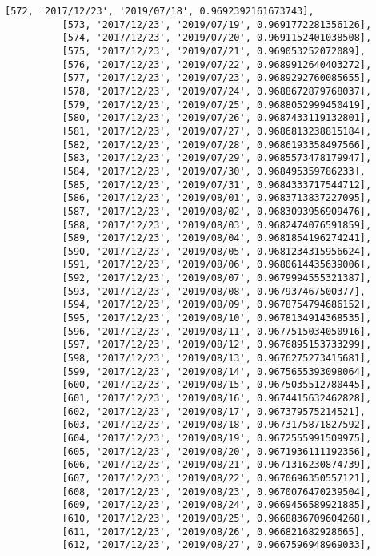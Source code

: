 \documentclass[11pt]{article}
\begin{document}
\begin{Verbatim}[commandchars=\\\{\}]
          [572, '2017/12/23', '2019/07/18', 0.9692392161673743],
          [573, '2017/12/23', '2019/07/19', 0.9691772281356126],
          [574, '2017/12/23', '2019/07/20', 0.9691152401038508],
          [575, '2017/12/23', '2019/07/21', 0.969053252072089],
          [576, '2017/12/23', '2019/07/22', 0.9689912640403272],
          [577, '2017/12/23', '2019/07/23', 0.9689292760085655],
          [578, '2017/12/23', '2019/07/24', 0.9688672879768037],
          [579, '2017/12/23', '2019/07/25', 0.9688052999450419],
          [580, '2017/12/23', '2019/07/26', 0.9687433119132801],
          [581, '2017/12/23', '2019/07/27', 0.9686813238815184],
          [582, '2017/12/23', '2019/07/28', 0.9686193358497566],
          [583, '2017/12/23', '2019/07/29', 0.9685573478179947],
          [584, '2017/12/23', '2019/07/30', 0.968495359786233],
          [585, '2017/12/23', '2019/07/31', 0.9684333717544712],
          [586, '2017/12/23', '2019/08/01', 0.9683713837227095],
          [587, '2017/12/23', '2019/08/02', 0.9683093956909476],
          [588, '2017/12/23', '2019/08/03', 0.9682474076591859],
          [589, '2017/12/23', '2019/08/04', 0.9681854196274241],
          [590, '2017/12/23', '2019/08/05', 0.9681234315956624],
          [591, '2017/12/23', '2019/08/06', 0.9680614435639006],
          [592, '2017/12/23', '2019/08/07', 0.9679994555321387],
          [593, '2017/12/23', '2019/08/08', 0.967937467500377],
          [594, '2017/12/23', '2019/08/09', 0.9678754794686152],
          [595, '2017/12/23', '2019/08/10', 0.9678134914368535],
          [596, '2017/12/23', '2019/08/11', 0.9677515034050916],
          [597, '2017/12/23', '2019/08/12', 0.9676895153733299],
          [598, '2017/12/23', '2019/08/13', 0.9676275273415681],
          [599, '2017/12/23', '2019/08/14', 0.9675655393098064],
          [600, '2017/12/23', '2019/08/15', 0.9675035512780445],
          [601, '2017/12/23', '2019/08/16', 0.9674415632462828],
          [602, '2017/12/23', '2019/08/17', 0.967379575214521],
          [603, '2017/12/23', '2019/08/18', 0.9673175871827592],
          [604, '2017/12/23', '2019/08/19', 0.9672555991509975],
          [605, '2017/12/23', '2019/08/20', 0.9671936111192356],
          [606, '2017/12/23', '2019/08/21', 0.9671316230874739],
          [607, '2017/12/23', '2019/08/22', 0.9670696350557121],
          [608, '2017/12/23', '2019/08/23', 0.9670076470239504],
          [609, '2017/12/23', '2019/08/24', 0.9669456589921885],
          [610, '2017/12/23', '2019/08/25', 0.9668836709604268],
          [611, '2017/12/23', '2019/08/26', 0.966821682928665],
          [612, '2017/12/23', '2019/08/27', 0.9667596948969033],

\end{Verbatim}
\end{document}
